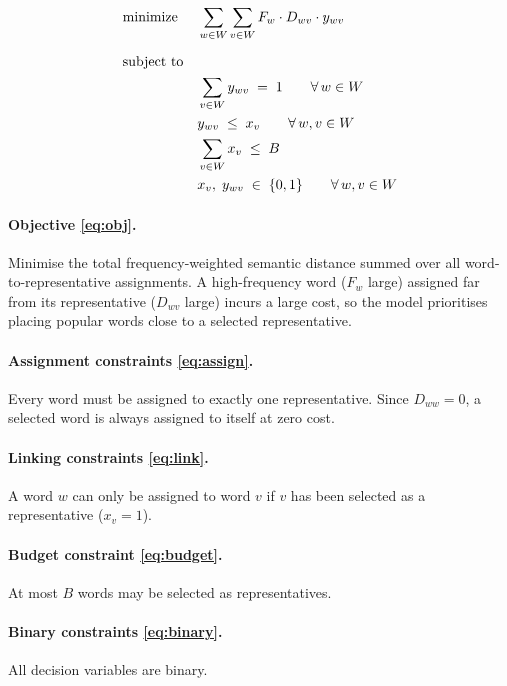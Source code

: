 \documentclass[11pt]{article}
\begin{document}
\begin{alignat}{3}
    &\underset{}{\text{minimize}}\; & &
    \sum_{w \in W}\sum_{v \in W} F_{w} \cdot D_{wv} \cdot y_{wv}
    \label{eq:obj} \\[6pt]
    &\text{subject to} \notag \\
    & & & \sum_{v \in W} y_{wv} \;=\; 1
    \qquad \forall\, w \in W
    \label{eq:assign} \\
    & & & y_{wv} \;\leq\; x_{v}
    \qquad \forall\, w, v \in W
    \label{eq:link} \\
    & & & \sum_{v \in W} x_{v} \;\leq\; B
    \label{eq:budget} \\
    & & & x_{v},\; y_{wv} \;\in\; \{0,1\}
    \qquad \forall\, w, v \in W
    \label{eq:binary}
\end{alignat}

\paragraph{Objective \eqref{eq:obj}.}
Minimise the total frequency-weighted semantic distance summed over all
word-to-representative assignments. A high-frequency word ($F_w$ large) assigned
far from its representative ($D_{wv}$ large) incurs a large cost, so the model
prioritises placing popular words close to a selected representative.

\paragraph{Assignment constraints \eqref{eq:assign}.}
Every word must be assigned to exactly one representative.
Since $D_{ww} = 0$, a selected word is always assigned to itself at zero cost.

\paragraph{Linking constraints \eqref{eq:link}.}
A word $w$ can only be assigned to word $v$ if $v$ has been selected as a
representative ($x_v = 1$).

\paragraph{Budget constraint \eqref{eq:budget}.}
At most $B$ words may be selected as representatives.

\paragraph{Binary constraints \eqref{eq:binary}.}
All decision variables are binary.
\end{document}
